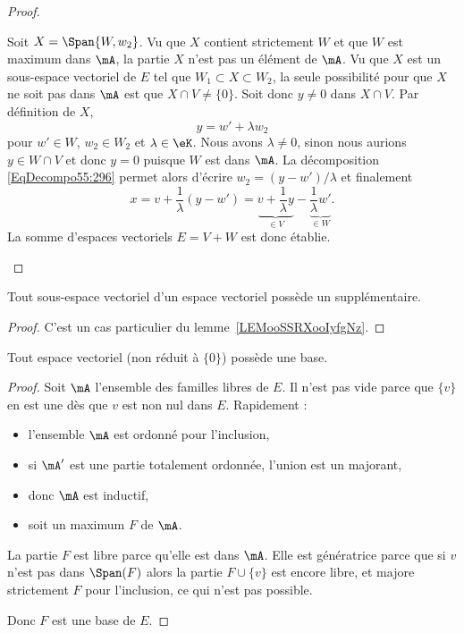 \begin{proof}
\begin{subproof}
            Soit \( X=\Span\{ W,w_2 \}\). Vu que \( X\) contient strictement \( W\) et que \( W\) est maximum dans \( \mA\), la partie \( X\) n'est pas un élément de \( \mA\). Vu que \( X\) est un sous-espace vectoriel de \( E\) tel que \( W_1\subset X\subset W_2\), la seule possibilité pour que \( X\) ne soit pas dans \( \mA\) est que \( X\cap V\neq \{ 0 \}\). Soit donc \( y\neq 0\) dans \( X\cap V\). Par définition de \( X\),
            \begin{equation}\label{EqDecompo55:296}
                y=w'+\lambda w_2
            \end{equation}
            pour \( w'\in W\), \( w_2\in W_2\) et \( \lambda\in \eK\). Nous avons \( \lambda\neq 0\), sinon nous aurions \( y\in W\cap V \) et donc \(y = 0 \) puisque \( W \) est dans \( \mA \). La décomposition \eqref{EqDecompo55:296} permet alors d'écrire \( w_2=(y-w')/\lambda\) et finalement
            \begin{equation}
                x=v+\frac{1}{ \lambda }(y-w')=\underbrace{v+\frac{1}{ \lambda }y}_{\in V}-\underbrace{\frac{1}{ \lambda }w'}_{\in W}.
            \end{equation}
            La somme d'espaces vectoriels \( E=V+W\) est donc établie.
    \end{subproof}
\end{proof}

\begin{corollary}
    Tout sous-espace vectoriel d'un espace vectoriel possède un supplémentaire.
\end{corollary}

\begin{proof}
    C'est un cas particulier du lemme~\ref{LEMooSSRXooIyfgNz}.
\end{proof}

\begin{proposition}
    Tout espace vectoriel (non réduit à \( \{ 0 \}\)) possède une base.
\end{proposition}

\begin{proof}
    Soit \( \mA\) l'ensemble des familles libres de \( E\). Il n'est pas vide parce que \( \{ v \}\) en est une dès que \( v\) est non nul dans \( E\). Rapidement :
    \begin{itemize}
        \item l'ensemble \( \mA\) est ordonné pour l'inclusion,
        \item si \( \mA'\) est une partie totalement ordonnée, l'union est un majorant,
        \item donc \( \mA\) est inductif,
        \item soit un maximum \( F\) de \( \mA\).
    \end{itemize}
    La partie \( F\) est libre parce qu'elle est dans \( \mA\). Elle est génératrice parce que si \( v\) n'est pas dans \( \Span(F)\) alors la partie \( F\cup\{ v \}\) est encore libre, et majore strictement $F$ pour l'inclusion, ce qui n'est pas possible.

    Donc \( F\) est une base de \( E\).
\end{proof}

